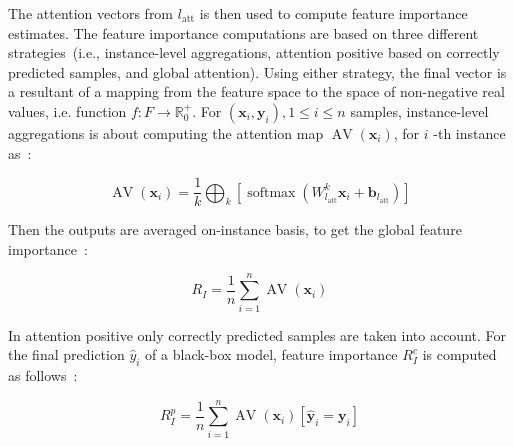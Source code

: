 \hspace*{3.5mm} The attention vectors from $l_{\text {att}}$ is then used to compute feature importance estimates. The feature importance computations are based on three different strategies~(i.e., instance-level aggregations, attention positive based on correctly predicted samples, and global attention). Using either strategy,  the final vector is a resultant of a mapping from the feature space to the space of non-negative real values, i.e. function $f: F \rightarrow \mathbb{R}_{0}^{+}$. 
For $\left(\boldsymbol{x}_{i}, \boldsymbol{y}_{i}\right), 1 \leq i \leq n$ samples, instance-level aggregations is about computing the attention map $\operatorname{AV}\left(\boldsymbol{x}_{i}\right)$, for $i$ -th instance as~\cite{vskrlj2020feature}: 

\begin{equation}
    \operatorname{AV}\left(\boldsymbol{x}_{i}\right)=\frac{1}{k} \bigoplus_{k}\left[\operatorname{softmax}\left(W_{l_{\mathrm{att}}}^{k} \boldsymbol{x}_{i}+\boldsymbol{b}_{l_{\mathrm{att}}}\right)\right]
\end{equation}

\hspace*{3.5mm} Then the outputs are averaged on-instance basis, to get the global feature importance~\cite{vskrlj2020feature}: 

\begin{equation}
    R_{I}=\frac{1}{n} \sum_{i=1}^{n} \operatorname{AV}\left(\boldsymbol{x}_{i}\right)
\end{equation}

\hspace*{3.5mm} In attention positive only correctly predicted samples are taken into account. For the final prediction $\hat{y}_{i}$ of a black-box model, feature importance $R_{I}^{c}$ is computed as follows~\cite{vskrlj2020feature}:

\begin{equation}
    R_{I}^{p}=\frac{1}{n} \sum_{i=1}^{n} \operatorname{AV}\left(\boldsymbol{x}_{i}\right)\left[\hat{\boldsymbol{y}}_{i}=\boldsymbol{y}_{i}\right]
\end{equation}

